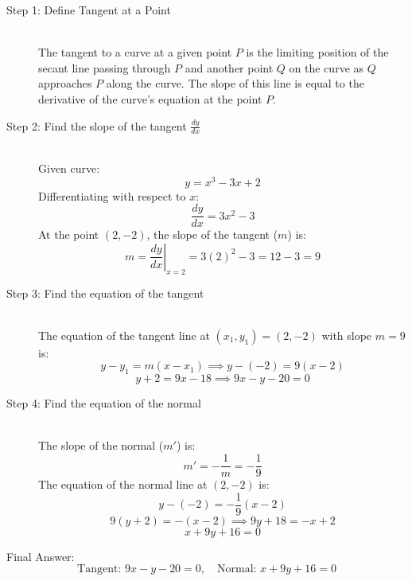 \documentclass[11pt, a4paper]{article}
\begin{document}
\begin{description}
    \item[Step 1: Define Tangent at a Point] \ \\
    The tangent to a curve at a given point $P$ is the limiting position of the secant line passing through $P$ and another point $Q$ on the curve as $Q$ approaches $P$ along the curve. The slope of this line is equal to the derivative of the curve's equation at the point $P$.

    \item[Step 2: Find the slope of the tangent $\frac{dy}{dx}$] \ \\
    Given curve:
    \[ y = x^3 - 3x + 2 \]
    Differentiating with respect to $x$:
    \[ \frac{dy}{dx} = 3x^2 - 3 \]
    At the point $(2, -2)$, the slope of the tangent ($m$) is:
    \[ m = \left. \frac{dy}{dx} \right|_{x=2} = 3(2)^2 - 3 = 12 - 3 = 9 \]

    \item[Step 3: Find the equation of the tangent] \ \\
    The equation of the tangent line at $(x_1, y_1) = (2, -2)$ with slope $m = 9$ is:
    \[ y - y_1 = m(x - x_1) \implies y - (-2) = 9(x - 2) \]
    \[ y + 2 = 9x - 18 \implies 9x - y - 20 = 0 \]

    \item[Step 4: Find the equation of the normal] \ \\
    The slope of the normal ($m'$) is:
    \[ m' = -\frac{1}{m} = -\frac{1}{9} \]
    The equation of the normal line at $(2, -2)$ is:
    \[ y - (-2) = -\frac{1}{9}(x - 2) \]
    \[ 9(y + 2) = -(x - 2) \implies 9y + 18 = -x + 2 \]
    \[ x + 9y + 16 = 0 \]
\end{description}

Final Answer:
\[ 
\boxed{\text{Tangent: } 9x - y - 20 = 0, \quad \text{Normal: } x + 9y + 16 = 0} 
\]


\end{document}
